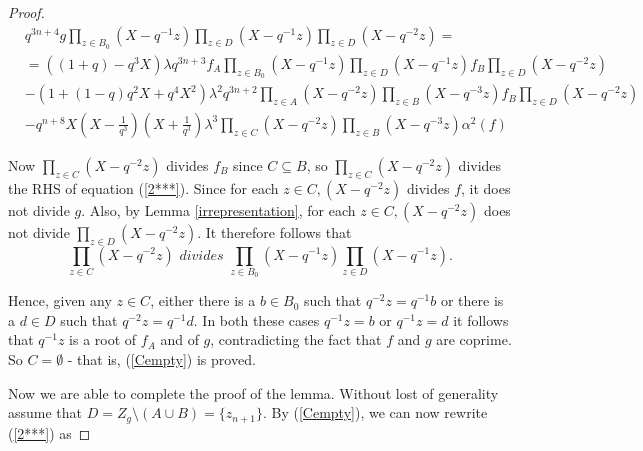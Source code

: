 \documentclass[a4paper, 11pt]{article}
\theoremstyle{definition}
\begin{document}
\begin{proof}

\begin{equation}\label{2***}
\begin{split}
&q^{3n+4}g \prod_{z\in B_0}(X-q^{-1}z)\prod_{z\in D}(X-q^{-1}z)\prod_{z\in D}(X-q^{-2}z)=\\
&=\left((1+q)-q^3X\right)\lambda q^{3n+3}f_A\prod_{z\in B_0}(X-q^{-1}z)\prod_{z\in D}(X-q^{-1}z)f_B\prod_{z\in D}(X-q^{-2}z)\\
&-\left(1+(1-q)q^2X+q^4X^2\right)\lambda^2q^{3n+2}\prod_{z\in A}(X-q^{-2}z)\prod_{z\in B}(X-q^{-3}z)f_B\prod_{z\in D}(X-q^{-2}z)\\
&-q^{n+8}X(X-\frac{1}{q^3})(X+\frac{1}{q^3})\lambda^3\prod_{z\in C}(X-q^{-2}z)\prod_{z\in B}(X-q^{-3}z)\alpha^2(f)
\end{split}
\end{equation}

Now $\prod_{z\in C}(X-q^{-2}z)$ divides $f_B$ since $C\subseteq B$, so $\prod_{z\in C}(X-q^{-2}z)$ divides the RHS of equation (\ref{2***}). Since for each $z\in C, (X-q^{-2}z)$ divides $f$, it does not divide $g$. Also, by Lemma \ref{irrepresentation},  for each $z\in C, (X-q^{-2}z)$ does not divide $\prod_{z\in D}(X-q^{-2}z)$. It therefore follows that
\begin{equation}\label{division}\prod_{z\in C}(X-q^{-2}z) \textit{ divides } \prod_{z\in B_0}(X-q^{-1}z)\prod_{z\in D}(X-q^{-1}z).\end{equation}

\noindent Hence, given any $z\in C$, either there is a $b\in B_0$ such that $q^{-2}z=q^{-1}b$ or there is a $d\in D$ such that $q^{-2}z=q^{-1}d$. In both these cases $q^{-1}z=b$ or $q^{-1}z=d$ it follows that  $q^{-1}z$  is a root of $f_A$ and of $g$, contradicting the fact that $f$ and $g$ are coprime. So $C=\emptyset$ - that is,  (\ref{Cempty}) is proved.

\medskip

Now we are able to complete the proof of the lemma. Without lost of generality assume that $D=Z_g\setminus (A\cup B)=\{z_{n+1}\}$. By (\ref{Cempty}), we can now rewrite (\ref{2***}) as




\end{proof}
\end{document}
